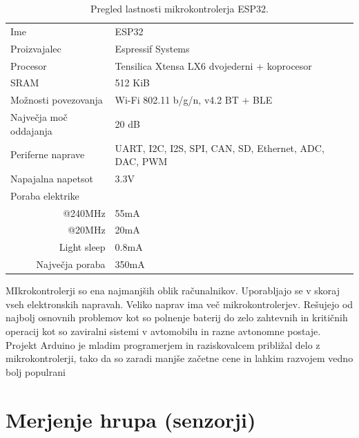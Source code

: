 \documentclass[a4paper, 12pt]{book}
\begin{document}
\begin{table}[]
\begin{tabular}{ll}
Ime                                 & ESP32                                                 \\
Proizvajalec                        & Espressif Systems                                     \\
Procesor                            & Tensilica Xtensa LX6 dvojederni + koprocesor          \\
SRAM                                & 512 KiB                                               \\
Možnosti povezovanja                & Wi-Fi 802.11 b/g/n, v4.2 BT + BLE                     \\
Največja moč oddajanja              & 20 dB                                                 \\
Periferne naprave                   & UART, I2C, I2S, SPI, CAN, SD, Ethernet, ADC, DAC, PWM \\
Napajalna napetsot                  & 3.3V                                                  \\
Poraba elektrike                    &                                                       \\
\multicolumn{1}{r}{@240MHz}         & 55mA                                                  \\
\multicolumn{1}{r}{@20MHz}          & 20mA                                                  \\
\multicolumn{1}{r}{Light sleep}     & 0.8mA                                                 \\
\multicolumn{1}{r}{Največja poraba} & 350mA                                                
\end{tabular}
\caption{Pregled lastnosti mikrokontrolerja ESP32.}
\label{fig:esp32_spec}
\end{table}
MIkrokontrolerji so ena najmanjših oblik računalnikov. Uporabljajo se v skoraj vseh elektronskih napravah. Veliko naprav ima več mikrokontrolerjev. 
Rešujejo od najbolj osnovnih problemov kot so polnenje baterij do zelo zahtevnih in kritičnih operacij kot so zaviralni sistemi v avtomobilu in razne avtonomne postaje.
Projekt Arduino je mladim programerjem in raziskovalcem približal delo z mikrokontrolerji, tako da so zaradi manjše začetne cene in lahkim razvojem vedno bolj populrani  

\section{Merjenje hrupa (senzorji)}
\end{document}
